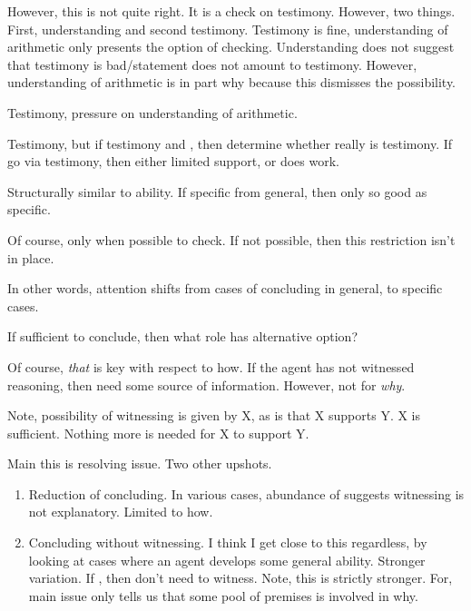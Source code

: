 \begin{note}
  However, this is not quite right.
  It is a check on testimony.
  However, two things.
  First, understanding and second testimony.
  Testimony is fine, understanding of arithmetic only presents the option of checking.
  Understanding does not suggest that testimony is bad/statement does not amount to testimony.
  However, understanding of arithmetic is in part why because this dismisses the possibility.

  Testimony, pressure on understanding of arithmetic.

  Testimony, but if testimony and , then determine whether really is testimony.
  If go via testimony, then either limited support, or  does work.

  Structurally similar to ability.
  If specific from general, then only so good as specific.

  Of course, only when possible to check.
  If not possible, then this restriction isn't in place.

  In other words, attention shifts from cases of concluding in general, to specific cases.

  If sufficient to conclude, then what role has alternative option?
\end{note}

\begin{note}
  Of course, \emph{that}  is key with respect to how.
  If the agent has not witnessed reasoning, then need some source of information.
  However, not for \emph{why}.

  Note, possibility of witnessing is given by X, as is that X supports Y.
  X is sufficient.
  Nothing more is needed for X to support Y.
\end{note}

\begin{note}
  Main this is resolving issue.
  Two other upshots.

  \begin{enumerate}
  \item
    Reduction of concluding.
    In various cases, abundance of  suggests witnessing is not explanatory.
    Limited to how.
  \item
    Concluding without witnessing.
    {
      \color{red}
      I think I get close to this regardless, by looking at cases where an agent develops some general ability.
    }
    Stronger variation.
    If , then don't need to witness.
    Note, this is strictly stronger.
    For, main issue only tells us that some pool of premises is involved in why.
  \end{enumerate}
\end{note}

